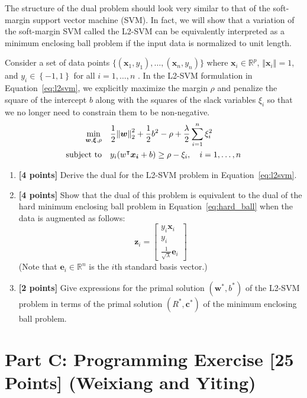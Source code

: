 \documentclass{article}
\def\R{\mathbb{R}}
\def\T{^\intercal}
\newcommand{\st}{\mathop{\mathrm{subject\,\,to}}}
\begin{document}
The structure of the dual problem should look very similar to that of the soft-margin support vector 
machine (SVM). In fact, we will show that a variation of the soft-margin SVM called the L2-SVM can be equivalently interpreted 
as a minimum enclosing ball problem if the input data is normalized to unit length.

Consider a set of data points $\{\left(\boldsymbol{x}_1,y_1\right),\dotsc,\left(\boldsymbol{x}_n,y_n\right)\}$ where $\boldsymbol{x}_i \in \R^p$, $\left\Vert \boldsymbol{x}_{i}\right\Vert=1$, and $y_i \in \left\{-1,1\right\}$ for all $i=1,\dotsc,n$ . In the L2-SVM formulation in Equation~\ref{eq:l2svm}, we explicitly maximize the margin $\rho$ and penalize the square of the intercept $b$ along with the squares of the slack variables $\xi_i$ so that we no longer need to constrain them to be non-negative. 
\begin{align}
    \min_{\boldsymbol{w}, \boldsymbol{\xi}, \rho}&\quad \frac{1}{2} \norm{\boldsymbol{w}}_2^2 + \frac{1}{2}b^2- \rho + \frac{\lambda}{2} \sum_{i=1}^n \xi_i^2 \nonumber\\
    \st&\quad y_i(w\T \boldsymbol{x_i} + b) \ge \rho - \xi_i,\quad i = 1,\dotsc,n \label{eq:l2svm}		
\end{align}
\begin{enumerate}[resume]
    \item \textbf{[4 points]} Derive the dual for the L2-SVM problem in Equation~\ref{eq:l2svm}.
		\item \textbf{[4 points]} Show that the dual of this problem is equivalent to the dual of the hard minimum enclosing ball problem in Equation~\ref{eq:hard_ball} when the data is augmented as follows:
		\[\boldsymbol{z}_{i}=\left[\begin{array}{c}
y_{i}\boldsymbol{x}_{i}\\
y_{i}\\
\frac{1}{\sqrt{\lambda}}\boldsymbol{e}_{i}
\end{array}\right]\]
(Note that $\boldsymbol{e}_i\in\mathbb{R}^n$ is the $i$th standard basis vector.)
	\item \textbf{[2 points]} Give expressions for the primal solution $\left( \boldsymbol{w}^{*}, b^{*} \right)$ of the L2-SVM problem in terms of the primal solution $\left( R^{*}, \boldsymbol{c}^{*} \right)$ of the minimum enclosing ball problem.
		
\end{enumerate}

\newpage


\section*{Part C: Programming Exercise [25 Points] (Weixiang and Yiting)}
\end{document}
